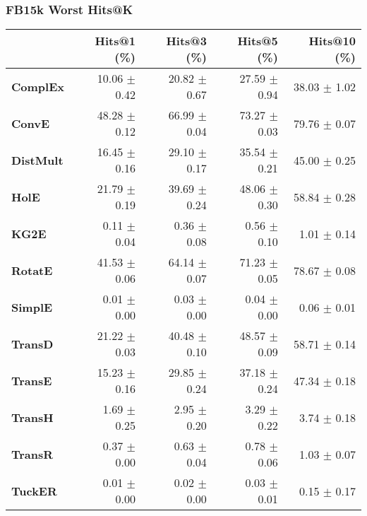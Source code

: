 \documentclass{article}
\begin{document}
\subsubsection{FB15k Worst Hits@K}
    \begin{center}
    \begin{tabular}{lrrrr}
\toprule
{} &   Hits@1 (\%) &   Hits@3 (\%) &   Hits@5 (\%) &  Hits@10 (\%) \\
\midrule
\textbf{ComplEx } &  10.06 $\pm$ 0.42 &  20.82 $\pm$ 0.67 &  27.59 $\pm$ 0.94 &  38.03 $\pm$ 1.02 \\
\textbf{ConvE   } &  48.28 $\pm$ 0.12 &  66.99 $\pm$ 0.04 &  73.27 $\pm$ 0.03 &  79.76 $\pm$ 0.07 \\
\textbf{DistMult} &  16.45 $\pm$ 0.16 &  29.10 $\pm$ 0.17 &  35.54 $\pm$ 0.21 &  45.00 $\pm$ 0.25 \\
\textbf{HolE    } &  21.79 $\pm$ 0.19 &  39.69 $\pm$ 0.24 &  48.06 $\pm$ 0.30 &  58.84 $\pm$ 0.28 \\
\textbf{KG2E    } &  $\phantom{5}$0.11 $\pm$ 0.04 &  $\phantom{5}$0.36 $\pm$ 0.08 &  $\phantom{5}$0.56 $\pm$ 0.10 &  $\phantom{5}$1.01 $\pm$ 0.14 \\
\textbf{RotatE  } &  41.53 $\pm$ 0.06 &  64.14 $\pm$ 0.07 &  71.23 $\pm$ 0.05 &  78.67 $\pm$ 0.08 \\
\textbf{SimplE  } &  $\phantom{5}$0.01 $\pm$ 0.00 &  $\phantom{5}$0.03 $\pm$ 0.00 &  $\phantom{5}$0.04 $\pm$ 0.00 &  $\phantom{5}$0.06 $\pm$ 0.01 \\
\textbf{TransD  } &  21.22 $\pm$ 0.03 &  40.48 $\pm$ 0.10 &  48.57 $\pm$ 0.09 &  58.71 $\pm$ 0.14 \\
\textbf{TransE  } &  15.23 $\pm$ 0.16 &  29.85 $\pm$ 0.24 &  37.18 $\pm$ 0.24 &  47.34 $\pm$ 0.18 \\
\textbf{TransH  } &  $\phantom{5}$1.69 $\pm$ 0.25 &  $\phantom{5}$2.95 $\pm$ 0.20 &  $\phantom{5}$3.29 $\pm$ 0.22 &  $\phantom{5}$3.74 $\pm$ 0.18 \\
\textbf{TransR  } &  $\phantom{5}$0.37 $\pm$ 0.00 &  $\phantom{5}$0.63 $\pm$ 0.04 &  $\phantom{5}$0.78 $\pm$ 0.06 &  $\phantom{5}$1.03 $\pm$ 0.07 \\
\textbf{TuckER  } &  $\phantom{5}$0.01 $\pm$ 0.00 &  $\phantom{5}$0.02 $\pm$ 0.00 &  $\phantom{5}$0.03 $\pm$ 0.01 &  $\phantom{5}$0.15 $\pm$ 0.17 \\
\bottomrule
\end{tabular}

    \end{center}
\end{document}
